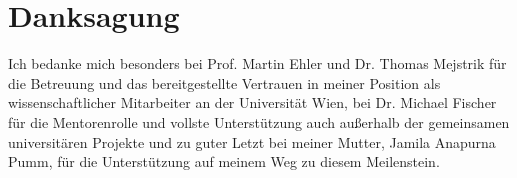 \chapter*{Danksagung}
\label{ch:danksagung}
Ich bedanke mich besonders bei Prof.
Martin Ehler und Dr.
Thomas Mejstrik für die Betreuung und das bereitgestellte Vertrauen in meiner Position als wissenschaftlicher Mitarbeiter an der Universität Wien, bei Dr.
Michael Fischer für die Mentorenrolle und vollste Unterstützung auch außerhalb der gemeinsamen universitären Projekte und zu guter Letzt bei meiner Mutter, Jamila Anapurna Pumm, für die Unterstützung auf meinem Weg zu diesem Meilenstein.

